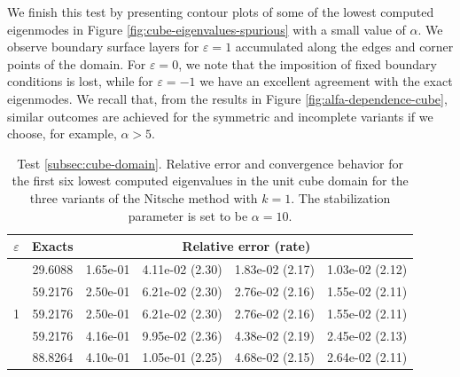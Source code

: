 \documentclass[onefignum,onetabnum,final]{siamart250211}
\numberwithin{equation}{section}
\newcommand\0{\boldsymbol{0}}
\begin{document}
	We finish this test by presenting contour plots of some of the lowest computed eigenmodes in Figure \ref{fig:cube-eigenvalues-spurious} with a small value of $\alpha$. We observe boundary surface layers for $\varepsilon=1$ accumulated along the edges and corner points of the domain. For $\varepsilon=0$, we note that the imposition of fixed boundary conditions is lost, while for $\varepsilon=-1$ we have an excellent agreement with the exact eigenmodes. We recall that, from the results in Figure \ref{fig:alfa-dependence-cube}, similar outcomes are achieved for the symmetric and incomplete variants if we choose, for example, $\alpha > 5$.
	
	\begin{table}[!hbt]
		\centering
		{\setlength{\tabcolsep}{3.8pt}\footnotesize
			\caption{Test \ref{subsec:cube-domain}. Relative error and convergence behavior for the first six lowest computed eigenvalues in the unit cube domain for the three variants of the Nitsche method with $k=1$. The stabilization parameter is set to be $\alpha=10$.}
			\label{tabla:cube-convergence-k1}
			\begin{tabular}{|c|c|cccc|}
				\hline
				$\varepsilon$& Exacts & \multicolumn{4}{c|}{Relative error (rate)} \\
				\hline
				\multirow{6}{0.02\linewidth}{1}&   29.6088 &   1.65e-01  &   4.11e-02 (2.30) &   1.83e-02 (2.17) &   1.03e-02 (2.12)   \\
				&   59.2176 &   2.50e-01  &   6.21e-02 (2.30) &   2.76e-02 (2.16) &   1.55e-02 (2.11)   \\
				&   59.2176 &   2.50e-01  &   6.21e-02 (2.30) &   2.76e-02 (2.16) &   1.55e-02 (2.11)   \\
				&   59.2176 &   4.16e-01  &   9.95e-02 (2.36) &   4.38e-02 (2.19) &   2.45e-02 (2.13)   \\
				&   88.8264 &   4.10e-01  &   1.05e-01 (2.25) &   4.68e-02 (2.15) &   2.64e-02 (2.11)   \\
				

\end{tabular}}
\end{table}
\end{document}
